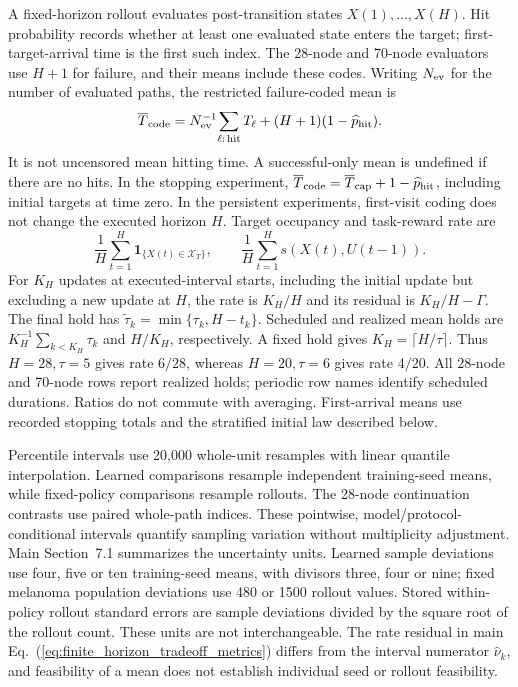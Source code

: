 \documentclass[11pt]{article}
\newcommand{\1}{\mathbf{1}}
\begin{document}
\begingroup
{}
A fixed-horizon rollout evaluates post-transition states $X(1),\ldots,X(H)$. Hit probability records whether at least one evaluated state enters the target; first-target-arrival time is the first such index. The 28-node and 70-node evaluators use $H+1$ for failure, and their means include these codes. Writing $N_{\rm ev}$ for the number of evaluated paths, the restricted failure-coded mean is
\[
 \overline T_{\rm code}=N_{\rm ev}^{-1}\!\sum_{\ell:\,\mathrm{hit}}T_\ell+(H+1)(1-\widehat p_{\rm hit}).
\]
It is not uncensored mean hitting time. A successful-only mean is undefined if there are no hits. In the stopping experiment, $\overline T_{\rm code}=\overline T_{\rm cap}+1-\widehat p_{\rm hit}$, including initial targets at time zero. In the persistent experiments, first-visit coding does not change the executed horizon $H$. Target occupancy and task-reward rate are
\[
 \frac1H\sum_{t=1}^{H}\1_{\{X(t)\in\mathcal X_T\}},
 \qquad
 \frac1H\sum_{t=1}^{H}s(X(t),U(t-1)).
\]
For $K_H$ updates at executed-interval starts, including the initial update but excluding a new update at $H$, the rate is $K_H/H$ and its residual is $K_H/H-\Gamma$. The final hold has $\tilde\tau_k=\min\{\tau_k,H-t_k\}$. Scheduled and realized mean holds are $K_H^{-1}\sum_{k<K_H}\tau_k$ and $H/K_H$, respectively. A fixed hold gives $K_H=\lceil H/\tau\rceil$. Thus $H=28,\tau=5$ gives rate $6/28$, whereas $H=20,\tau=6$ gives rate $4/20$. All 28-node and 70-node rows report realized holds; periodic row names identify scheduled durations. Ratios do not commute with averaging. First-arrival means use recorded stopping totals and the stratified initial law described below.\par
\endgroup

Percentile intervals use 20,000 whole-unit resamples with linear quantile interpolation. Learned comparisons resample independent training-seed means, while fixed-policy comparisons resample rollouts. The 28-node continuation contrasts use paired whole-path indices. These pointwise, model/protocol-conditional intervals quantify sampling variation without multiplicity adjustment. Main Section~7.1 summarizes the uncertainty units. Learned sample deviations use four, five or ten training-seed means, with divisors three, four or nine; fixed melanoma population deviations use 480 or 1500 rollout values. Stored within-policy rollout standard errors are sample deviations divided by the square root of the rollout count. These units are not interchangeable. The rate residual in main Eq.~\textup{(\ref*{eq:finite_horizon_tradeoff_metrics})} differs from the interval numerator $\widehat\nu_k$, and feasibility of a mean does not establish individual seed or rollout feasibility.
\end{document}
